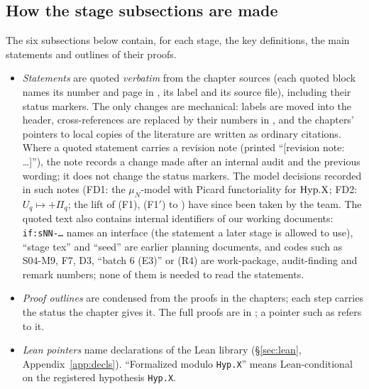 \subsection{How the stage subsections are made}\label{ss:outline-how}
The six subsections below contain, for each stage, the key definitions, the main statements and outlines of their proofs.
\begin{itemize}
\item \emph{Statements} are quoted \emph{verbatim} from the chapter sources  (each quoted
  block names its number and page in \mainpdf{} \cite{LLmain}, its label and its source file), including their status markers.
  The only changes are mechanical: labels are moved into the header, cross-references are replaced by their numbers in
  \mainpdf, and the chapters' pointers to local copies of the literature are written as ordinary citations. Where a quoted
  statement carries a revision note (printed ``[revision note: \dots]''), the note records a change made after an internal audit
  and the previous wording; it does not change the status markers. The model decisions recorded in such notes (FD1: the
  $\mu_N$-model with Picard functoriality for $\mathrm{Hyp.X}$; FD2: $U_q\mapsto+\Pi_q$; the lift of (F1), (F1$'$) to \stpmc) have since been
  taken by the team. The quoted text also contains internal identifiers of our working documents: \texttt{if:sNN-\dots} names
  an interface (the statement a later stage is allowed to use), ``stage tex'' and ``seed'' are earlier planning documents, and
  codes such as S04-M9, F7, D3, ``batch 6 (E3)'' or (R4) are work-package, audit-finding and remark numbers; none of them is
  needed to read the statements.
\item \emph{Proof outlines} are condensed from the proofs in the chapters; each step carries the status the chapter gives it.
  The full proofs are in \mainpdf; a pointer such as  refers to it.
\item \emph{Lean pointers}  name declarations of the Lean library (\S\ref{sec:lean},
  Appendix~\ref{app:decls}). ``Formalized modulo \texttt{Hyp.X}'' means Lean-conditional on the registered hypothesis \texttt{Hyp.X}.
\end{itemize}

